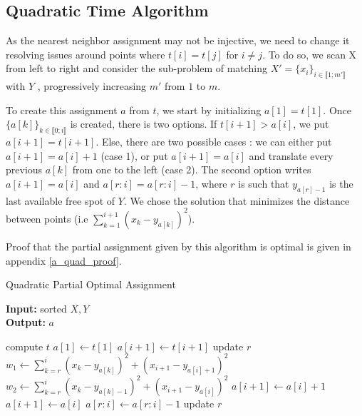 \documentclass[a4paper,12pt]{article}
\begin{document}
\subsection{Quadratic Time Algorithm}

As the nearest neighbor assignment may not be injective, we need to change it resolving issues around points where $t[i] = t[j]$ for $i \neq j$. To do so, we scan X from left to right and consider the sub-problem of matching $X' = \{x_i \}_{i \in \llbracket 1;m' \rrbracket} $ with $Y$ , progressively increasing $m'$ from $1$ to $m$. 

To create this assignment $a$ from $t$, we start by initializing $a[1] = t[1]$. Once $\{a[k]\}_{k \in \llbracket 0;i \rrbracket}$ is created, there is two options. If $t[i+1]>a[i]$, we put $a[i+1]=t[i+1]$. Else, there are two possible cases : we can either put $a[i+1]=a[i]+1$ (case 1), or put $a[i+1]=a[i]$ and translate every previous $a[k]$ from one to the left (case 2). The second option writes $ a[i+1] = a[i]$ and $a[r:i] = a[r:i]-1 $, where $r$ is such that $y_{a[r]-1}$ is the last available free spot of $Y$. We chose the solution that minimizes the distance between points (i.e $\sum_{k=1}^{i+1} (x_k - y_{a[k]})^2$). 

Proof that the partial assignment given by this algorithm is optimal is given in appendix \ref{a_quad_proof}.\\

\begin{algorithm}
\caption{Quadratic Partial Optimal Assignment}\label{a_quad}
\hspace*{\algorithmicindent} \textbf{Input:} sorted $X,Y$\\
\hspace*{\algorithmicindent} \textbf{Output:} $a$ 
\begin{algorithmic}[1]
\State compute $t$
\State $a[1] \gets t[1]$
		\State $a[i+1] \gets t[i+1]$
		\State update $r$
    \Else
        \State $w_1 \gets \sum_{k=r}^{i} (x_k - y_{a[k]})^2 + (x_{i+1} - y_{a[i]+1})^2$
        \State $w_2 \gets \sum_{k=r}^{i} (x_k - y_{a[k]-1})^2 + (x_{i+1} - y_{a[i]})^2$
         
        	\State $a[i+1] \gets a[i]+1$
        \Else {}
        	\State $a[i+1] \gets a[i]$
        	\State $a[r:i] \gets a[r:i]-1$
        	\State update $r$
        \EndIf
    \EndIf
\EndFor
\State {}
\end{algorithmic}
\end{algorithm}
\end{document}
